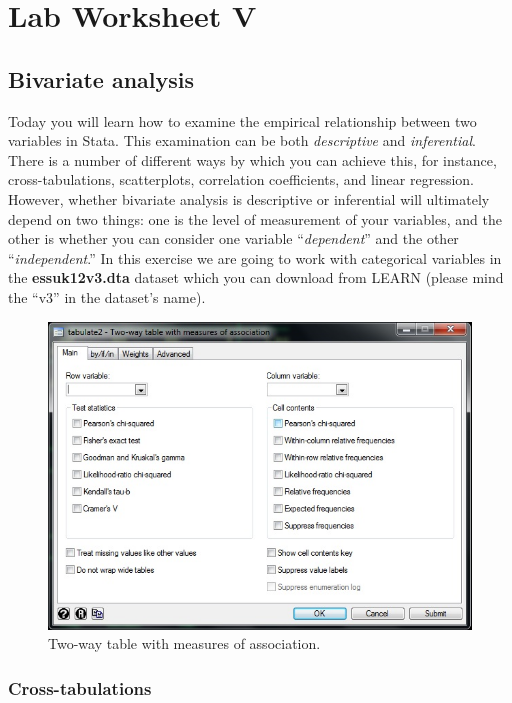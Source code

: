 \documentclass{article}
\begin{document}
	
\section*{\hfil Lab Worksheet V \hfil}
\subsection*{Bivariate analysis}

Today you will learn how to examine the empirical relationship between two variables in Stata. This examination can be both \textit{descriptive} and \textit{inferential}. There is a number of different ways by which you can achieve this, for instance, cross-tabulations, scatterplots, correlation coefficients, and linear regression. However, whether bivariate analysis is descriptive or inferential will ultimately depend on two things: one is the level of measurement of your variables, and the other is whether you can consider one variable ``\textit{dependent}'' and the other ``\textit{independent}.'' In this exercise we are going to work with categorical variables in the \textbf{essuk12v3.dta} dataset which you can download from LEARN (please mind the ``v3'' in the dataset's name).

\begin{figure}[H]
	\includegraphics[width=\linewidth]{Tabulate2.jpg}
	\caption{Two-way table with measures of association.}
\end{figure}

\subsubsection*{Cross-tabulations}
\end{document}
